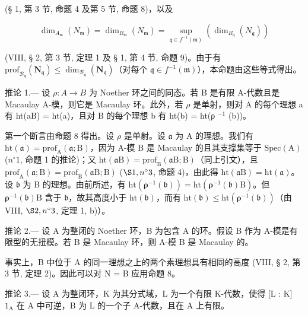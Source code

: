 (§ 1, 第 3 节, 命题 4 及第 5 节, 命题 8)，以及

\[
\dim_ {A _ {\mathfrak {m}}} \left(N _ {\mathfrak {m}}\right) = \dim_ {B _ {\mathfrak {m}}} \left(N _ {\mathfrak {m}}\right) = \sup _ {\mathfrak {q} \in f ^ {- 1} (\mathfrak {m})} \left(\dim_ {B _ {\mathfrak {q}}} \left(N _ {\mathfrak {q}}\right)\right)
\]

(VIII, § 2, 第 3 节, 定理 1 及 § 1, 第 4 节, 命题 9)。由于有 \(\mathrm{prof}_{\mathcal{B}_{\mathfrak{q}}}(\mathbf{N}_{\mathfrak{q}}) \leqslant \dim_{\mathcal{B}_{\mathfrak{q}}}(\mathbf{N}_{\mathfrak{q}})\)（对每个 \(\mathfrak{q} \in f^{-1}(\mathfrak{m})\)），本命题由这些等式得出。

推论 1.--- 设 \(\rho: A \to B\) 为 Noether 环之间的同态。若 B 是有限 A-代数且是 Macaulay A-模，则它是 Macaulay 环。此外，若 \(\rho\) 是单射，则对 A 的每个理想 a 有 ht(aB) = ht(a)，且对 B 的每个理想 b 有 ht(b) = ht(ρ \(^{-1}\) (b))。

第一个断言由命题 8 得出。设 \(\rho\) 是单射。设 \(\mathfrak{a}\) 为 A 的理想。我们有 \(\mathrm{ht}(\mathfrak{a}) = \mathrm{prof}_{\mathrm{A}}(\mathfrak{a};\mathrm{B})\)，因为 A-模 B 是 Macaulay 的且其支撑集等于 \(\mathrm{Spec}(\mathrm{A})\) (\(n^{\circ}1\), 命题 1 的推论)；又 \(\mathrm{ht}(\mathfrak{a}\mathrm{B}) = \mathrm{prof}_{\mathrm{B}}(\mathfrak{a}\mathrm{B};\mathrm{B})\)（同上引文），且 \(\mathrm{prof}_{\mathrm{A}}(\mathfrak{a};\mathrm{B}) = \mathrm{prof}_{\mathrm{B}}(\mathfrak{a}\mathrm{B};\mathrm{B})\) (\(\S 1, n^{\circ}3\), 命题 4)，由此得 \(\mathrm{ht}(\mathfrak{a}\mathrm{B}) = \mathrm{ht}(\mathfrak{a})\)。设 \(\mathfrak{b}\) 为 B 的理想。由前所述，有 \(\mathrm{ht}(\boldsymbol{\rho}^{-1}(\mathfrak{b})) = \mathrm{ht}(\boldsymbol{\rho}^{-1}(\mathfrak{b})\mathrm{B})\)。但 \(\boldsymbol{\rho}^{-1}(\mathfrak{b})\mathrm{B}\) 含于 \(\mathfrak{b}\)，故其高度小于 \(\mathrm{ht}(\mathfrak{b})\)，而有 \(\mathrm{ht}(\mathfrak{b}) \leqslant \mathrm{ht}(\boldsymbol{\rho}^{-1}(\mathfrak{b}))\)（由 VIII, \(\S 2, n^{\circ}3\), 定理 1, b)）。

推论 2.--- 设 A 为整闭的 Noether 环，B 为包含 A 的环。假设 B 作为 A-模是有限型的无扭模。若 B 是 Macaulay 环，则 A-模 B 是 Macaulay 的。

事实上，B 中位于 A 的同一理想之上的两个素理想具有相同的高度 (VIII, § 2, 第 3 节, 定理 2)。因此可以对 N = B 应用命题 8。

推论 3.--- 设 A 为整闭环，K 为其分式域，L 为一个有限 K-代数，使得 {[}L : K{]} \(1_{\mathrm{A}}\) 在 A 中可逆，B 为 L 的一个子 A-代数，且在 A 上有限。

